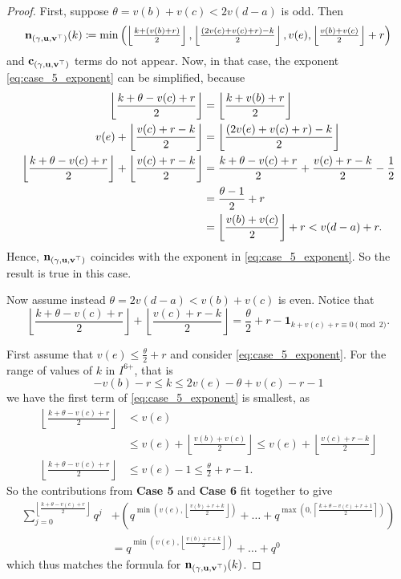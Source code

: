 \begin{proof}
  First, suppose $\theta = v(b) + v(c) < 2v(d-a)$ is odd.
  Then
  \[ \mathbf n_{(\gamma, \mathbf u, \mathbf v^\top)}(k) \coloneqq \min\left( \left\lfloor \tfrac{k + (v(b)+r)}{2} \right\rfloor,
      \left\lfloor \tfrac{(2v(e)+v(c)+r)-k}{2} \right\rfloor,
      v(e), \left\lfloor \tfrac{v(b)+v(c)}{2} \right\rfloor + r \right) \]
  and $\mathbf c_{(\gamma, \mathbf u, \mathbf v^\top)}$ terms do not appear.
  Now, in that case, the exponent \eqref{eq:case_5_exponent} can be simplified, because
  \begin{align*}
    \left\lfloor \frac{k+\theta-v(c)+r}{2} \right\rfloor
    &= \left\lfloor \frac{k+v(b)+r}{2} \right\rfloor \\
    v(e) + \left\lfloor \frac{v(c)+r-k}{2} \right\rfloor
    &= \left\lfloor \frac{(2v(e) + v(c) + r) - k}{2} \right\rfloor \\
    \left\lfloor \frac{k+\theta-v(c)+r}{2} \right\rfloor
    + \left\lfloor \frac{v(c)+r-k}{2} \right\rfloor
    &= \frac{k+\theta-v(c)+r}{2} + \frac{v(c)+r-k}{2} - \frac{1}{2} \\
    &= \frac{\theta-1}{2} + r \\
    &= \left\lfloor \frac{v(b)+v(c)}{2} \right\rfloor + r < v(d-a) + r.
  \end{align*}
  Hence, $\mathbf n_{(\gamma, \mathbf u, \mathbf v^\top)}$ coincides with the exponent in \eqref{eq:case_5_exponent}.
  So the result is true in this case.

  Now assume instead $\theta = 2v(d-a) < v(b) + v(c)$ is even.
  Notice that
  \[ \left\lfloor \frac{k+\theta-v(c)+r}{2} \right\rfloor
    + \left\lfloor \frac{v(c)+r-k}{2} \right\rfloor
    = \frac{\theta}{2} + r - \mathbf{1}_{k + v(c) + r \equiv 0 \pmod 2}. \]

  First assume that $v(e) \le \frac{\theta}{2} + r$ and
  consider \eqref{eq:case_5_exponent}.
  For the range of values of $k$ in $I^{\text{6+}}$, that is
  \[ -v(b) - r \le k \le 2v(e)-\theta+v(c)-r-1 \]
  we have the first term of \eqref{eq:case_5_exponent} is smallest, as
  \begin{align*}
    \left\lfloor \frac{k + \theta - v(c) + r}{2} \right\rfloor &< v(e) \\
    &\le v(e) + \left\lfloor \frac{v(b)+v(c)}{2} \right\rfloor
      \le v(e) + \left\lfloor \frac{v(c)+r-k}{2} \right\rfloor \\
    \left\lfloor \frac{k + \theta - v(c) + r}{2} \right\rfloor &\le v(e)-1
      \le \frac{\theta}{2} + r -1.
  \end{align*}
  So the contributions from \textbf{Case 5} and \textbf{Case 6}
  fit together to give
  \begin{align*}
    \sum_{j=0}^{\left\lfloor \frac{k+\theta-v(c)+r}{2} \right\rfloor} q^j
    &+
    \left(
    q^{\min\left( v(e), \left\lfloor \frac{v(b) + r + k}{2} \right\rfloor \right)}
    + \dots
    + q^{\max\left(0, \left\lceil \frac{k + \theta - v(c) + r + 1}{2} \right\rceil \right)}
    \right) \\
    &=
    q^{\min(v(e), \left\lfloor \frac{v(b) + r + k}{2} \right\rfloor)} + \dots + q^0
  \end{align*}
  which thus matches the formula for $\mathbf n_{(\gamma, \mathbf u, \mathbf v^\top)}(k)$.


\end{proof}
